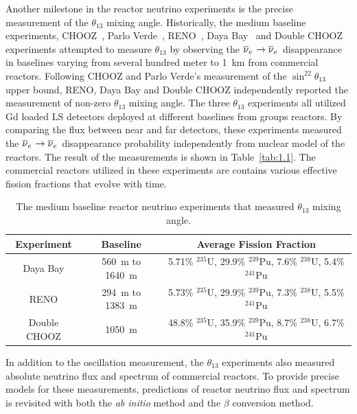     Another milestone in the reactor neutrino experiments is the precise measurement of the $\theta_{13}$ mixing angle. 
    Historically, the medium baseline experiments, CHOOZ~\cite{bib:chooz03}, Parlo Verde~\cite{bib:palo2000}, RENO~\cite{bib:RENO}, Daya Bay~\cite{bib:DYBosc} and Double CHOOZ~\cite{bib:DBChooz} experiments attempted to measure $\theta_{13}$ by observing the $\overline{\nu }_{e}\hspace{1pt}\rightarrow\overline{\nu }_{e}\hspace{1pt}$ disappearance in baselines varying from several hundred meter to 1~km from commercial reactors.
    Following CHOOZ and Parlo Verde's measurement of the $\sin^22\theta_{13}$ upper bound, RENO, Daya Bay and Double CHOOZ independently reported the measurement of non-zero $\theta_{13}$ mixing angle.
    The three $\theta_{13}$ experiments all utilized Gd loaded LS detectors deployed at different baselines from groups reactors.
    By comparing the \nuebar flux between near and far detectors, these experiments measured the $\overline{\nu }_{e}\hspace{1pt}\rightarrow\overline{\nu }_{e}\hspace{1pt}$ disappearance probability independently from nuclear model of the reactors.
    The result of the measurements is shown in Table~\ref{tab:1.1}.
    The commercial reactors utilized in these experiments are contains various effective fission fractions that evolve with time.
    \begin{table}[h]
    \centering
    \caption[$\theta_{13}$ reactor experiments]{The medium baseline reactor neutrino experiments that measured $\theta_{13}$ mixing angle.
}
    \begin{tabular}{ccc}
    \hline
    \hline
    Experiment  & Baseline   & Average Fission Fraction   \\ 
    \hline
    Daya Bay     & 560~m to 1640~m  & 5.71\% $^{235}$U, 29.9\% $^{239}$Pu, 7.6\% $^{238}$U, 5.4\% $^{241}$Pu \\
    RENO     & 294~m to 1383~m & 5.73\% $^{235}$U, 29.9\% $^{239}$Pu, 7.3\% $^{238}$U, 5.5\% $^{241}$Pu \\
    Double CHOOZ    & 1050~m & 48.8\% $^{235}$U, 35.9\% $^{239}$Pu, 8.7\% $^{238}$U, 6.7\% $^{241}$Pu \\
    \hline
    \end{tabular}
    \label{tab:theta13}
    \end{table}

\label{c2s3}
        
    In addition to the oscillation measurement, the $\theta_{13}$ experiments also measured absolute neutrino flux and spectrum of commercial reactors. 
    To provide precise models for these measurements, predictions of reactor neutrino flux and spectrum is revisited with both the \textit{ab initio} method and the $\beta$ conversion method.
    
